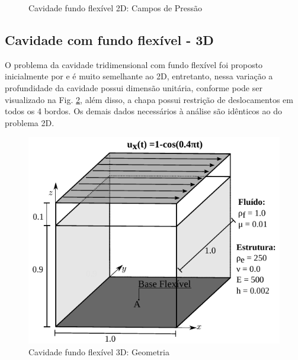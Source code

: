 \documentclass[tese_patricia]{subfiles}
\begin{document}
\begin{figure}[htb!]
	\caption{Cavidade fundo flexível 2D: Campos de Pressão}
	\label{fig:cavidadeFF2d_pressão}
\end{figure}



\subsection{Cavidade com fundo flexível - 3D}

O problema da cavidade tridimensional com fundo flexível foi proposto inicialmente por  e é muito semelhante ao 2D, entretanto, nessa variação a profundidade da cavidade possui dimensão unitária, conforme pode ser visualizado na Fig. \ref{fig:cavidadeFF3d_Geometria}, além disso, a chapa possui restrição de deslocamentos em todos os 4 bordos. Os demais dados necessários à análise são idênticos ao do problema 2D.

\begin{figure}[htb!]
	\centering 
	\includegraphics[scale=0.9,trim=0cm 0cm 0cm 0cm, clip=true]{Imagens/Cap7/cav3d.pdf}	
	\caption{Cavidade fundo flexível 3D: Geometria}
	\label{fig:cavidadeFF3d_Geometria}
\end{figure}
\end{document}
